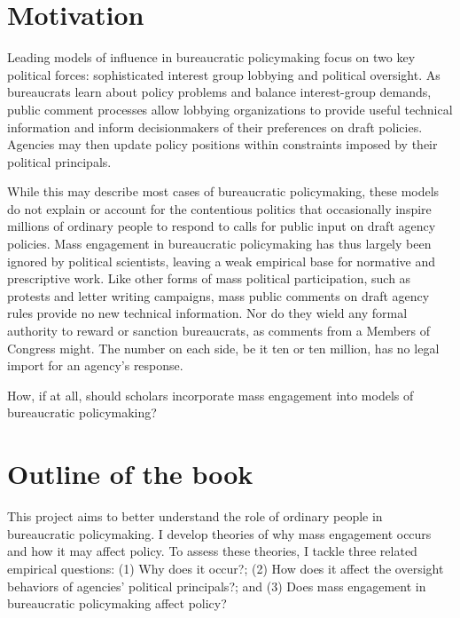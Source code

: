 \documentclass[
]{book}
\begin{document}
\hypertarget{motivation}{%
\section*{Motivation}\label{motivation}}

Leading models of influence in bureaucratic policymaking focus on two key political forces: sophisticated interest group lobbying and political oversight.
As bureaucrats learn about policy problems and balance interest-group demands, public comment processes allow lobbying organizations to provide useful technical information and inform decisionmakers of their preferences on draft policies.
Agencies may then update policy positions within constraints imposed by their political principals.

While this may describe most cases of bureaucratic policymaking, these models do not explain or account for the contentious politics that occasionally inspire millions of ordinary people to respond to calls for public input on draft agency policies. Mass engagement in bureaucratic policymaking has thus largely been ignored by political scientists, leaving a weak empirical base for normative and prescriptive work.
Like other forms of mass political participation, such as protests and letter writing campaigns,
mass public comments on draft agency rules provide no new technical information.
Nor do they wield any formal authority to reward or sanction bureaucrats, as comments from a Members of Congress might.
The number on each side, be it ten or ten million, has no legal import for an agency's response.

How, if at all, should scholars incorporate mass engagement into models of bureaucratic policymaking?

\hypertarget{outline-of-the-book}{%
\section*{Outline of the book}\label{outline-of-the-book}}

This project aims to better understand the role of ordinary people in bureaucratic policymaking.
I develop theories of why mass engagement occurs and how it may affect policy. To assess these theories, I tackle three related empirical questions: (1) Why does it occur?; (2) How does it affect the oversight behaviors of agencies' political principals?; and
(3) Does mass engagement in bureaucratic policymaking affect policy?
\end{document}
